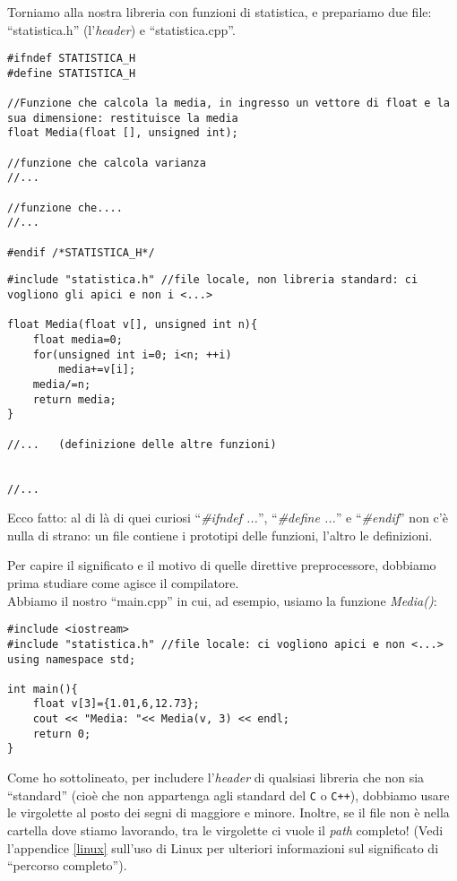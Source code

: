 Torniamo alla nostra libreria con funzioni di statistica, e prepariamo due file: ``statistica.h'' (l'\emph{header}) e ``statistica.cpp''.
\begin{lstlisting}[caption=statistica.h]
#ifndef STATISTICA_H
#define STATISTICA_H

//Funzione che calcola la media, in ingresso un vettore di float e la sua dimensione: restituisce la media
float Media(float [], unsigned int);

//funzione che calcola varianza
//...

//funzione che....
//...

#endif /*STATISTICA_H*/
\end{lstlisting}

\begin{lstlisting}[caption=statistica.cpp]
#include "statistica.h" //file locale, non libreria standard: ci vogliono gli apici e non i <...>

float Media(float v[], unsigned int n){
	float media=0;
	for(unsigned int i=0; i<n; ++i)
		media+=v[i];
	media/=n;
	return media;
}

//...	(definizione delle altre funzioni)


//...
\end{lstlisting}

Ecco fatto: al di là di quei curiosi ``\emph{\#ifndef ...}'', ``\emph{\#define ...}'' e ``\emph{\#endif}'' non c'è nulla di strano: un file contiene i prototipi delle funzioni, l'altro le definizioni. 

Per capire il significato e il motivo di quelle direttive preprocessore, dobbiamo prima studiare come agisce il compilatore.   \\

Abbiamo il nostro ``main.cpp'' in cui, ad esempio, usiamo la funzione \emph{Media()}:
\begin{lstlisting}[caption=main.cpp]
#include <iostream>
#include "statistica.h" //file locale: ci vogliono apici e non <...>
using namespace std;

int main(){
	float v[3]={1.01,6,12.73};
	cout << "Media: "<< Media(v, 3) << endl;
	return 0;	
}
\end{lstlisting}

Come ho sottolineato, per includere l'\emph{header} di qualsiasi libreria che non sia ``standard'' (cioè che non appartenga agli standard del \verb|C| o \verb|C++|), dobbiamo usare le virgolette al posto dei segni di maggiore e minore. Inoltre, se il file non è nella cartella dove stiamo lavorando,  tra le virgolette ci vuole il \emph{path} completo! (Vedi l'appendice \ref{linux}  sull'uso di Linux per ulteriori informazioni sul significato di ``percorso completo''). \\
 
